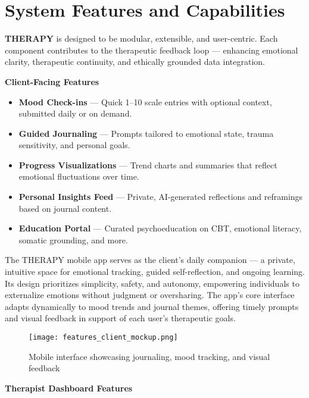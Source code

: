 \section*{System Features and Capabilities}

\textbf{THERAPY} is designed to be modular, extensible, and user-centric. Each component contributes to the therapeutic feedback loop — enhancing emotional clarity, therapeutic continuity, and ethically grounded data integration.

\bigskip

\noindent\textbf{Client-Facing Features}

\begin{itemize}
  \item \textbf{Mood Check-ins} — Quick 1–10 scale entries with optional context, submitted daily or on demand.
  \item \textbf{Guided Journaling} — Prompts tailored to emotional state, trauma sensitivity, and personal goals.
  \item \textbf{Progress Visualizations} — Trend charts and summaries that reflect emotional fluctuations over time.
  \item \textbf{Personal Insights Feed} — Private, AI-generated reflections and reframings based on journal content.
  \item \textbf{Education Portal} — Curated psychoeducation on CBT, emotional literacy, somatic grounding, and more.
\end{itemize}

\bigskip

The THERAPY mobile app serves as the client’s daily companion — a private, intuitive space for emotional tracking, guided self-reflection, and ongoing learning. Its design prioritizes simplicity, safety, and autonomy, empowering individuals to externalize emotions without judgment or oversharing. The app’s core interface adapts dynamically to mood trends and journal themes, offering timely prompts and visual feedback in support of each user’s therapeutic goals.

\begin{figure}[H]
  \centering
  \texttt{[image: features\_client\_mockup.png]}
  \caption{Mobile interface showcasing journaling, mood tracking, and visual feedback}
\end{figure}

\bigskip

\noindent\textbf{Therapist Dashboard Features}

